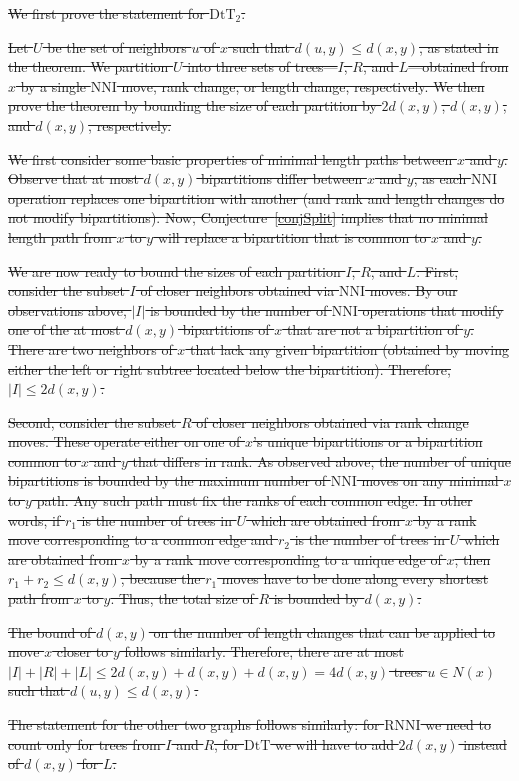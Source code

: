 \documentclass[11pt]{amsart}
\theoremstyle{definition}
\newcommand{\nni}{\mathrm{NNI}}
\newcommand{\rnni}{\mathrm{RNNI}}
\newcommand{\dtt}{\mathrm{DtT}}
\providecommand{\DIFdeltex}[1]{{\protect\color{red}\sout{#1}}}                      %
\providecommand{\DIFdelend}{} %
\providecommand{\DIFdel}[1]{\texorpdfstring{\DIFdeltex{#1}}{}} %
\begin{document}
\DIFdel{We first prove the statement for $\dtt_2$.
}%

\DIFdel{Let $U$ be the set of neighbors $u$ of $x$ such that $d(u,y) \le d(x,y)$, as stated in the theorem.
We partition $U$ into three sets of trees---$I$, $R$, and $L$---obtained from $x$ by a single $\nni$ move, rank change, or length change, respectively.
We then prove the theorem by bounding the size of each partition by $2d(x,y)$, $d(x,y)$, and $d(x,y)$, respectively.
}%

\DIFdel{We first consider some basic properties of minimal length paths between $x$ and $y$.
Observe that at most $d(x,y)$ bipartitions differ between $x$ and $y$, as each $\nni$ operation replaces one bipartition with another (and rank and length changes do not modify bipartitions).
Now, Conjecture~\ref{conjSplit} implies that no minimal length path from $x$ to $y$ will replace a bipartition that is common to $x$ and $y$.
}%

\DIFdel{We are now ready to bound the sizes of each partition $I$, $R$, and $L$.
First, consider the subset $I$ of closer neighbors obtained via $\nni$ moves.
By our observations above, $|I|$ is bounded by the number of $\nni$ operations that modify one of the at most $d(x,y)$ bipartitions of $x$ that are not a bipartition of $y$.
There are two neighbors of $x$ that lack any given bipartition (obtained by moving either the left or right subtree located below the bipartition).
Therefore, $|I| \le 2d(x,y)$.
}%

\DIFdel{Second, consider the subset $R$ of closer neighbors obtained via rank change moves.
These operate either on one of $x$'s unique bipartitions or a bipartition common to $x$ and $y$ that differs in rank.
As observed above, the number of unique bipartitions is bounded by the maximum number of $\nni$ moves on any minimal $x$ to $y$ path.
Any such path must fix the ranks of each common edge.
In other words, if $r_1$ is the number of trees in $U$ which are obtained from $x$ by a rank move corresponding to a common edge and $r_2$ is the number of trees in $U$ which are obtained from $x$ by a rank move corresponding to a unique edge of $x$, then $r_1 + r_2 \leq d(x,y)$, because the $r_1$ moves have to be done along every shortest path from $x$ to $y$.
Thus, the total size of $R$ is bounded by $d(x,y)$.
}%

\DIFdel{The bound of $d(x,y)$ on the number of length changes that can be applied to move $x$ closer to $y$ follows similarly.
Therefore, there are at most $|I| + |R| + |L| \le 2d(x,y) + d(x,y) + d(x,y) = 4d(x,y)$ trees $u \in N(x)$ such that $d(u, y) \le d(x, y)$.
}%

\DIFdel{The statement for the other two graphs follows similarly: for $\rnni$ we need to count only for trees from $I$ and $R$, for $\dtt$ we will have to add $2d(x,y)$ instead of $d(x,y)$ for $L$.
}%
\DIFdelend 


\printbibliography
\end{document}

